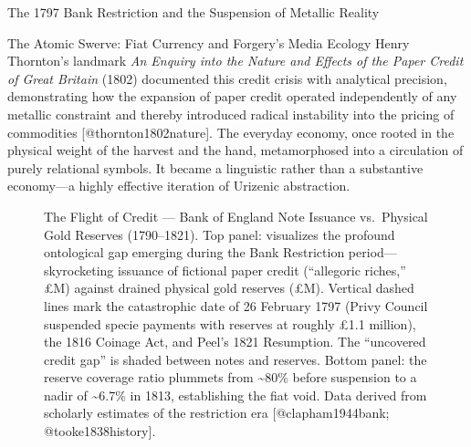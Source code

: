 \documentclass[
  ignorenonframetext,
]{beamer}
\makeatletter
\newcommand*\pandocbounded[1]{%
  \sbox\pandoc@box{#1}%
  \Gscale@div\@tempa{\textheight}{\dimexpr\ht\pandoc@box+\dp\pandoc@box\relax}%
  \Gscale@div\@tempb{\linewidth}{\wd\pandoc@box}%
  \ifdim\@tempb\p@<\@tempa\p@\let\@tempa\@tempb\fi%
  \ifdim\@tempa\p@<\p@\scalebox{\@tempa}{\usebox\pandoc@box}%
  \else\usebox{\pandoc@box}%
  \fi%
}
\makeatother
\begin{document}
\begin{frame}{The 1797 Bank Restriction and the Suspension of Metallic
Reality}
\begin{block}{The Atomic Swerve: Fiat Currency and Forgery's Media
Ecology}
Henry Thornton's landmark \emph{An Enquiry into the Nature and Effects
of the Paper Credit of Great Britain} (1802) documented this credit
crisis with analytical precision, demonstrating how the expansion of
paper credit operated independently of any metallic constraint and
thereby introduced radical instability into the pricing of commodities
{[}@thornton1802nature{]}. The everyday economy, once rooted in the
physical weight of the harvest and the hand, metamorphosed into a
circulation of purely relational symbols. It became a linguistic rather
than a substantive economy---a highly effective iteration of Urizenic
abstraction.

\begin{figure}
\centering
\pandocbounded{\includegraphics[keepaspectratio,alt={The Flight of Credit --- Bank of England Note Issuance vs.~Physical Gold Reserves (1790--1821). Top panel: visualizes the profound ontological gap emerging during the Bank Restriction period---skyrocketing issuance of fictional paper credit (``allegoric riches,'' £M) against drained physical gold reserves (£M). Vertical dashed lines mark the catastrophic date of 26 February 1797 (Privy Council suspended specie payments with reserves at roughly £1.1 million), the 1816 Coinage Act, and Peel's 1821 Resumption. The ``uncovered credit gap'' is shaded between notes and reserves. Bottom panel: the reserve coverage ratio plummets from \textasciitilde80\% before suspension to a nadir of \textasciitilde6.7\% in 1813, establishing the fiat void. Data derived from scholarly estimates of the restriction era {[}@clapham1944bank; @tooke1838history{]}.}]{../output/figures/historic_reserves_dark.pdf}}
\caption{The Flight of Credit --- Bank of England Note Issuance
vs.~Physical Gold Reserves (1790--1821). Top panel: visualizes the
profound ontological gap emerging during the Bank Restriction
period---skyrocketing issuance of fictional paper credit (``allegoric
riches,'' £M) against drained physical gold reserves (£M). Vertical
dashed lines mark the catastrophic date of 26 February 1797 (Privy
Council suspended specie payments with reserves at roughly £1.1
million), the 1816 Coinage Act, and Peel's 1821 Resumption. The
``uncovered credit gap'' is shaded between notes and reserves. Bottom
panel: the reserve coverage ratio plummets from \textasciitilde80\%
before suspension to a nadir of \textasciitilde6.7\% in 1813,
establishing the fiat void. Data derived from scholarly estimates of the
restriction era {[}@clapham1944bank;
@tooke1838history{]}.}\label{fig-historic-reserves}
\end{figure}
\end{block}


\end{frame}
\end{document}
